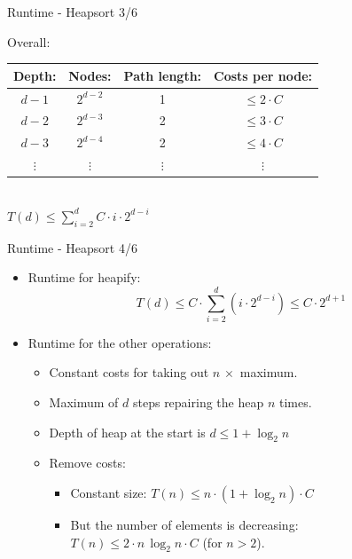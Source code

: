 \documentclass{beamer}
\newcommand{\Mittelblau}[1]{\textcolor{Mittel-Blau}{#1}}
\begin{document}
\begin{frame}{Runtime - Heapsort 3/6}
  \begin{tabl}
  \item Overall:
  \end{tabl}
      \begin{center}%
        \begin{tabular}{c|c|c|c}
          Depth:     & Nodes:    & Path length: & Costs per node:\\
          \hline
          $d - 1$    & $2^{d-2}$     & 1            & $\leq 2 \cdot C$\\
          $d - 2$    & $2^{d-3}$ & 2            & $\leq 3 \cdot C$\\
          $d - 3$    & $2^{d-4}$ & 2            & $\leq 4 \cdot C$\\
          $\vdots$   & $\vdots$  & $\vdots$     & $\vdots$ 
        \end{tabular}\\[3em]
       \quad \Mittelblau{$\displaystyle  T(d) \leq \sum^d_{i=2} C\cdot i \cdot 2^{d-i} $}

    \end{center}%

\end{frame}

\begin{frame}{Runtime - Heapsort 4/6}
  \begin{itemize}
    \item
      Runtime for heapify:
      \[\displaystyle
      T(d) \leq C \cdot \sum \limits^d_{i=2} \left(i \cdot 2^{d-i} \right)
      \leq C \cdot 2^{d + 1}\]
    \item
      Runtime for the other operations:
      \begin{itemize}
        \item
          Constant costs for taking out $n \, \times$ maximum.
        \item
          Maximum of $d$ steps repairing the heap $n$ times.
        \item
          Depth of heap at the start is $d \leq 1 + \log_2 n$
        \item
          Remove costs:
          \begin{itemize}
            \item
              Constant size:
              $T(n) \leq n \cdot (1 +\log_2 n) \cdot C$
            \item
              But the number of elements is decreasing:\\
              $T(n) \leq 2 \cdot n  \, \log_2 n \cdot C$ (for $n > 2$).
          \end{itemize}
      \end{itemize}
  \end{itemize}
\end{frame}
\end{document}
